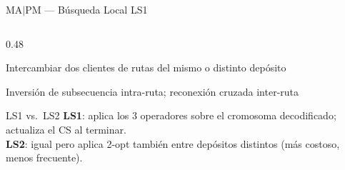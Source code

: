 \documentclass[aspectratio=169,10pt]{beamer}
\begin{document}
\begin{frame}{MA$|$PM --- Búsqueda Local LS1}
\begin{columns}[T,onlytextwidth]
\begin{column}{0.48\textwidth}
\begin{description}
        \item[\textsc{swap}] Intercambiar dos clientes de rutas del mismo o distinto depósito
        \item[\textsc{2-opt}] Inversión de subsecuencia intra-ruta; reconexión cruzada inter-ruta
      \end{description}
      \vspace{0.4em}
      \begin{block}{LS1 vs.\ LS2}\footnotesize
        \textbf{LS1}: aplica los 3 operadores sobre el cromosoma decodificado; actualiza el CS al terminar.\\
        \textbf{LS2}: igual pero aplica 2-opt también entre depósitos distintos (más costoso, menos frecuente).
      \end{block}
    \end{column}
  \end{columns}
\end{frame}
\end{document}
